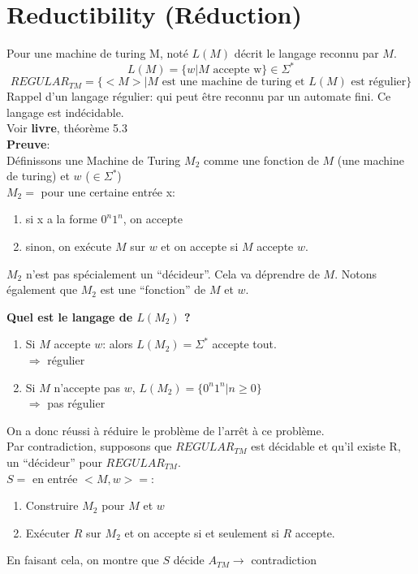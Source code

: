 \documentclass[a4paper,12pt]{article}
\begin{document}
\section{Reductibility (Réduction)}
  Pour une machine de turing M, noté $L(M)$ décrit le langage reconnu par $M$.
  $$L(M) = \{w | M \text{ accepte w} \} \in \Sigma^*$$
  $$REGULAR_{TM} = \{ <M> | M \text{ est une machine de turing et } L(M) \text{ est régulier}\}$$
  Rappel d'un langage régulier: qui peut être reconnu par un automate fini. Ce langage est indécidable.\\
  Voir \textbf{livre}, théorème 5.3\\
  \textbf{Preuve}:\\
    Définissons une Machine de Turing $M_2$ comme une fonction de $M$ (une machine de turing) et $w$ ($\in \Sigma^*$)\\
    $M_2 = $ pour une certaine entrée x:
    \begin{enumerate}
      \item si x a la forme $0^{n}1^{n}$, on accepte
      \item sinon, on exécute $M$ sur $w$ et on accepte si $M$ accepte $w$.
    \end{enumerate}
    $M_2$ n'est pas spécialement un ``décideur''.  Cela va déprendre de $M$.  Notons également que $M_2$ est une ``fonction'' de $M$ et $w$.

  \textbf{Quel est le langage de $L(M_2)$ ?}\\
  \begin{enumerate}
    \item Si $M$ accepte $w$: alors $L(M_2) = \Sigma^*$ accepte tout.\\
      $\Rightarrow$ régulier
    \item Si $M$ n'accepte pas $w$, $L(M_2) = \{0^n 1^n | n \geq 0\}$\\
      $\Rightarrow$ pas régulier
  \end{enumerate}
  On a donc réussi à réduire le problème de l'arrêt à ce problème.\\
  Par contradiction, supposons que $REGULAR_{TM}$ est décidable et qu'il existe R, un ``décideur'' pour $REGULAR_{TM}$.\\
  $S = $ en entrée $<M, w> = $:
  \begin{enumerate}
    \item Construire $M_2$ pour $M$ et $w$
    \item Exécuter $R$ sur $M_2$ et on accepte si et seulement si $R$ accepte.
  \end{enumerate}
  En faisant cela, on montre que $S$ décide $A_{TM} \rightarrow$ contradiction
    
\end{document}
